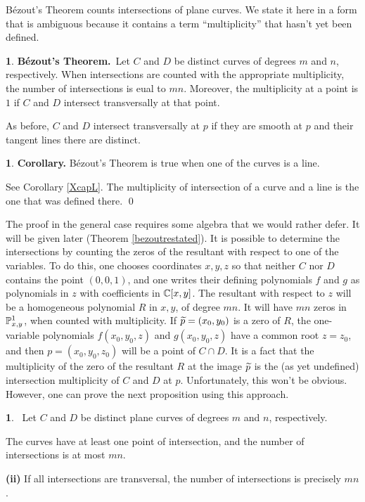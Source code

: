 \documentclass[leqno]{book}
\newcommand\Marginnote[1]{\marginnote{\hspace{-12pt}\normalfont{#1}}}
\theoremstyle{definition}%
\numberwithin{equation}{section}
\newtheorem{thm}[equation]{}
\theoremstyle{theorem} %
\newtheorem{proposition}[equation]{}
\newtheorem{corollary}[equation]{}
\begin{document}
\ms B\'ezout's Theorem counts intersections of plane curves.  We state
it here in a form that is ambiguous because it contains a term
``multiplicity'' that hasn't yet been defined.



 \begin{thm} {\bf B\'ezout's Theorem.}\Marginnote{bezoutone}\;\,
Let $C$ and $D$ be distinct curves of degrees $m$ and $n$,
respectively.  When intersections are counted with the appropriate
multiplicity, the number of intersections is eual to  $mn$.  Moreover,
the multiplicity at a point is $1$ if $C$ and $D$ intersect
transversally at that point.
\label{bezoutone}		\end{thm}


\no
As before, $C$ and $D$ intersect {transversally} at $p$ if they are
smooth at $p$ and their tangent lines there are distinct.


\begin{corollary}{\bf Corollary.} \Marginnote{bezoutline}
B\'ezout's Theorem is true when  one of the curves is a line.
\label{bezoutline} \end{corollary}

\no See Corollary \ref{XcapL}.  The multiplicity of intersection of a
curve and a line is the one that was  defined there.  \qed

\ms The proof in the general case requires some algebra that we would
rather defer.  It will be given later (Theorem \ref{bezoutrestated}).
It is possible to determine the intersections by counting the zeros of
the resultant with respect to one of the variables.  To do this, one
chooses coordinates $x,y,z$ so that neither $C$ nor $D$ contains the
point $(0,0,1)$, and one writes their defining polynomials $f$ and $g$
as polynomials in $z$ with coefficients in $\mathbb{C}[x,y]$.  The resultant
with respect to $z$ will be a homogeneous polynomial $R$ in $x,y$, of
degree $mn$.  It will have $mn$ zeros in $\mathbb{P}^1_{x,y}$, when
counted with multiplicity.  If $\widetilde p=(x_0,y_0)$ is a zero of $R$, the
one-variable polynomials $f(x_0,y_0,z)$ and $g(x_0,y_0,z)$ have a
common root $z=z_0$, and then $p=(x_0,y_0,z_0)$ will be a point of $C
\cap D$. It is a fact that the multiplicity of the zero of the
resultant $R$ at the image $\widetilde p$ is the (as yet undefined)
intersection multiplicity of $C$ and $D$ at $p$.  Unfortunately, this
won't be obvious.  However, one can prove the next proposition using this
approach.


\begin{proposition}{}
\Marginnote{nocommonfactor}\;\, Let $C$ and $D$ be distinct plane
curves of degrees $m$ and $n$, respectively.

 The curves have at least one point of intersection, and
the number of intersections is at most $mn$.

\no
{\bf (ii)}  If all intersections are transversal, the number
of intersections is precisely $mn$.
\label{nocommonfactor}\end{proposition}
\end{document}
